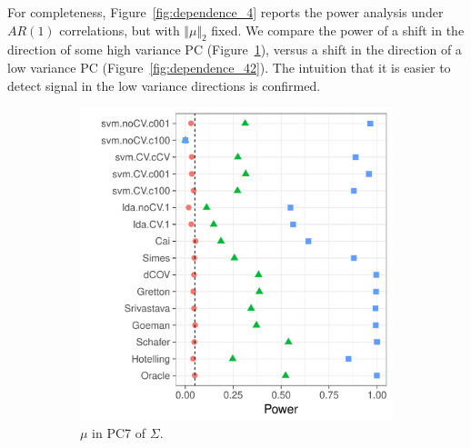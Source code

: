 \documentclass[oupdraft]{bio}
\begin{document}
For completeness, Figure~\ref{fig:dependence_4} reports the power analysis under $AR(1)$ correlations, but with $\Vert \mu \Vert_2$ fixed.
We compare the power of a shift in the direction of some high variance PC (Figure~\ref{fig:dependence_41}), versus a shift in the direction of a low variance PC (Figure~\ref{fig:dependence_42}).
The intuition that it is easier to detect signal in the low variance directions is confirmed. 

\begin{figure}[h]
	\centering
	\begin{subfigure}[t]{.45\columnwidth}
		\centering
		\includegraphics[width=1\columnwidth]{"file32"}
		\caption{$\mu$ in PC7 of $\Sigma$.}  
		\label{fig:dependence_41}	
	\end{subfigure}
	\begin{subfigure}[t]{0.45\columnwidth}
		\centering

\end{subfigure}
\end{figure}
\end{document}
